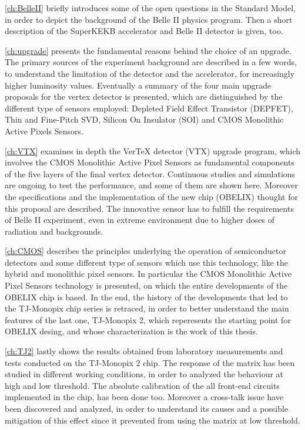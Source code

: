 \autoref{ch:BelleII} briefly introduces some of the open questions in the Standard Model, in order to depict the background of the Belle II physics program. Then a short description of the SuperKEKB accelerator and Belle II detector is given, too. 

\autoref{ch:upgrade} presents the fundamental reasons behind the choice of an upgrade. The primary sources of the experiment background are described in a few words, to understand the limitation of the detector and the accelerator, for increasingly higher luminosity values. Eventually a summary of the four main upgrade proposals for the vertex detector is presented, which are distinguished by the different type of sensors employed: Depleted Field Effect Transistor (DEPFET), Thin and Fine-Pitch SVD, Silicon On Insulator (SOI) and CMOS Monolithic Active Pixels Sensors.


\autoref{ch:VTX} examines in depth the VerTeX detector (VTX) upgrade program, which involves the CMOS Monolithic Active Pixel Sensors as fundamental components of the five layers of the final vertex detector. Continuous studies and simulations are ongoing to test the performance, and some of them are shown here. Moreover the specifications and the implementation of the new chip (OBELIX) thought for this proposal are described. The innovative sensor has to fulfill the requirements of Belle II experiment, even in extreme environment due to higher doses of radiation and backgrounds.

\autoref{ch:CMOS} describes the principles underlying the operation of semiconductor detectors and some different type of sensors which use this technology, like the hybrid and monolithic pixel sensors. In particular the CMOS Monolithic Active Pixel Sensors technology is presented, on which the entire developments of the OBELIX chip is based. In the end, the history of the developments that led to the TJ-Monopix chip series is retraced, in order to better understand the main features of the last one, TJ-Monopix 2, which reperesents the starting point for OBELIX desing, and whose characterization is the work of this thesis.

\autoref{ch:TJ2} lastly shows the results obtained from laboratory measurements and tests conducted on the TJ-Monopix 2 chip. The response of the matrix has been studied in different working conditions, in order to analyzed the behaviour at high and low threshold. The absolute calibration of the all front-end circuits implemented in the chip, has been done too.
Moreover a cross-talk issue have been discovered and analyzed, in order to understand its causes and a possible mitigation of this effect since it prevented from using the matrix at low threshold.

